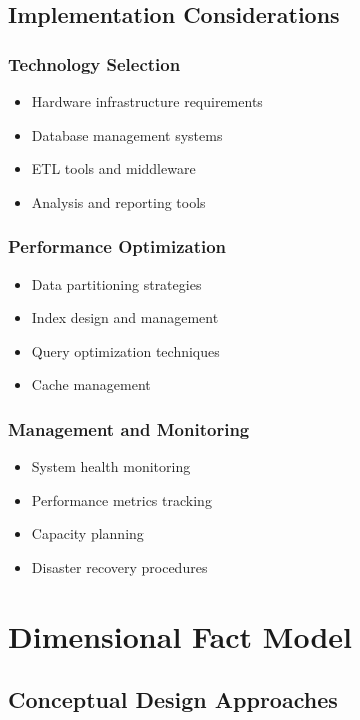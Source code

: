 \section{Implementation Considerations}

\subsection{Technology Selection}
\begin{itemize}
    \item Hardware infrastructure requirements
    \item Database management systems
    \item ETL tools and middleware
    \item Analysis and reporting tools
\end{itemize}

\subsection{Performance Optimization}
\begin{itemize}
    \item Data partitioning strategies
    \item Index design and management
    \item Query optimization techniques
    \item Cache management
\end{itemize}

\subsection{Management and Monitoring}
\begin{itemize}
    \item System health monitoring
    \item Performance metrics tracking
    \item Capacity planning
    \item Disaster recovery procedures
\end{itemize}
\chapter{Dimensional Fact Model}

\section{Conceptual Design Approaches}

